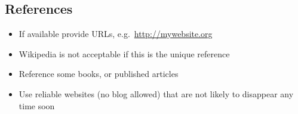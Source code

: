 \documentclass{article}
\begin{document}
\subsection*{References}

\begin{itemize}\itemsep .125cm
	\item If available provide URLs, e.g.~\url{http://mywebsite.org}
	\item Wikipedia is not acceptable if this is the unique reference
	\item Reference some books, or published articles
	\item Use reliable websites (no blog allowed) that are not likely to disappear any time soon
\end{itemize}

\ifx\onefile\undefined
	
\end{document}
